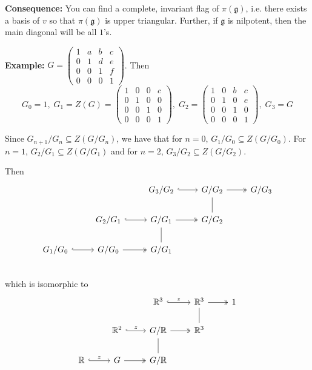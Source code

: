 \documentclass[12pt]{article}
\newcommand{\R}{\mathbb{R}}
\newcommand{\C}{\mathbb{C}}
\newcommand{\g}{\mathfrak{g}}
\newcommand{\gl}{\mathfrak{gl}}
\newenvironment*{tbox}[2][gray]{
    \begin{tcolorbox}[
        parbox=false,
        colback=#1!5!white,
        colframe=#1!75!black,
        breakable,
        title={#2}
    ]}
    {\end{tcolorbox}}
\begin{document}
    \begin{tbox}{\textbf{Theorem (of Lie):} Let $\g$ be a solvable lie algebra and let $\pi: \g \to \gl(v)$ (as a lie algebra $\gl(v)$ is given by $[A, B] = AB - BA$ though $V$ does not have a lie algebra structure). Further, assume for $x \in \g$, the eigenvalues of $\pi(x)$ are real (alternatively, extend everything to $\C$ so we can solve characteristic polynomials). Then, there exists a $v \neq 0$ so that $v$ is an eigenvector of $\pi(\g)$}
        \textbf{Consequence:} You can find a complete, invariant flag of $\pi(\g)$, i.e. there exists a basis of $v$ so that $\pi(\g)$ is upper triangular. Further, if $\g$ is nilpotent, then the main diagonal will be all $1$'s. 
    \end{tbox}

    \textbf{Example:} $G = \begin{pmatrix}
        1 & a & b & c\\ 
        0 & 1 & d & e\\
        0 & 0 & 1 & f\\
        0 & 0 & 0 & 1
    \end{pmatrix}$. Then 
    \[G_0 = 1,\; G_1 = Z(G) = \begin{pmatrix}
        1 & 0 & 0 & c\\ 
        0 & 1 & 0 & 0\\ 
        0 & 0 & 1 & 0\\ 
        0 & 0 & 0 & 1
    \end{pmatrix},\; G_2 = \begin{pmatrix}
        1 & 0 & b & c\\ 
        0 & 1 & 0 & e\\ 
        0 & 0 & 1 & 0\\ 
        0 & 0 & 0 & 1
    \end{pmatrix},\; G_3 = G\]

    Since $G_{n+1}/G_n \subseteq Z(G/G_n)$, we have that for $n=0$, $G_1/G_0 \subseteq Z(G/G_0)$. For $n=1$, $G_2/G_1 \subseteq Z(G/G_1)$ and for $n=2$, $G_3/G_2 \subseteq Z(G/G_2)$.

    Then 
    \[\begin{tikzcd}
        & & G_3/G_2 \arrow[hook]{r} & G/G_2 \arrow[two heads]{r} & G/G_3\\
        & G_2/G_1 \arrow[hook]{r} & G/G_1 \arrow[two heads]{r} & G/G_2 \arrow[no head]{u}\\
        G_1/G_0 \arrow[hook]{r} & G/G_0 \arrow[two heads]{r} & G/G_1 \arrow[no head]{u}\\
    \end{tikzcd}\]
    which is isomorphic to 
    \[\begin{tikzcd}
        & & \R^3 \arrow[hook]{r}{z} & \R^3 \arrow[two heads]{r} & 1\\
        & \R^2 \arrow[hook]{r}{z} & G/\R \arrow[two heads]{r} & \R^3 \arrow[no head]{u}\\
        \R \arrow[hook]{r}{z} & G \arrow[two heads]{r} & G/\R \arrow[no head]{u}\\
    \end{tikzcd}\]
\end{document}
